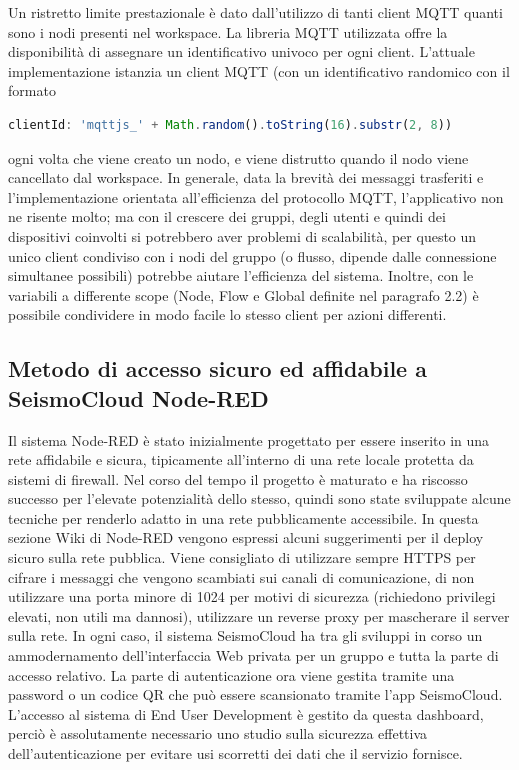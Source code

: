 \documentclass[a4paper,10pt]{memoir}
\begin{document}
Un ristretto limite prestazionale è dato dall'utilizzo di tanti client MQTT quanti sono i nodi presenti nel workspace. La libreria MQTT utilizzata offre la disponibilità di assegnare un identificativo univoco per ogni client.
L'attuale implementazione istanzia un client MQTT (con un identificativo randomico con il formato 
\begin{lstlisting}[language=Javascript]
clientId: 'mqttjs_' + Math.random().toString(16).substr(2, 8))
\end{lstlisting}
ogni volta che viene creato un nodo, e viene distrutto quando il nodo viene cancellato dal workspace.
In generale, data la brevità dei messaggi trasferiti e l'implementazione orientata all'efficienza del protocollo MQTT, l'applicativo non ne risente molto; ma con il crescere dei gruppi, degli utenti e quindi dei dispositivi coinvolti si potrebbero aver problemi di scalabilità, per questo un unico client condiviso con i nodi del gruppo (o flusso, dipende dalle connessione simultanee possibili) potrebbe aiutare l'efficienza del sistema.
Inoltre, con le variabili a differente scope (Node, Flow e Global definite nel paragrafo 2.2) è possibile condividere in modo facile lo stesso client per azioni differenti.

\subsection{Metodo di accesso sicuro ed affidabile a SeismoCloud Node-RED}

Il sistema Node-RED è stato inizialmente progettato per essere inserito in una rete affidabile e sicura, tipicamente all'interno di una rete locale protetta da sistemi di firewall. Nel corso del tempo il progetto è maturato e ha riscosso  successo per l'elevate potenzialità dello stesso, quindi sono state sviluppate alcune tecniche per renderlo adatto in una rete pubblicamente accessibile.
In questa sezione Wiki di Node-RED \cite{node-red-internet} vengono espressi alcuni suggerimenti per il deploy sicuro sulla rete pubblica.
Viene consigliato di utilizzare sempre HTTPS per cifrare i messaggi che vengono scambiati sui canali di comunicazione, di non utilizzare una porta minore di 1024 per motivi di sicurezza (richiedono privilegi elevati, non utili ma dannosi), utilizzare un reverse proxy per mascherare il server sulla rete. In ogni caso, il sistema SeismoCloud ha tra gli sviluppi in corso un ammodernamento dell'interfaccia Web privata per un gruppo e tutta la parte di accesso relativo. La parte di autenticazione ora viene gestita tramite una password o un codice QR che può essere scansionato tramite l'app SeismoCloud. L'accesso al sistema di End User Development è gestito da questa dashboard, perciò è assolutamente necessario uno studio sulla sicurezza effettiva dell'autenticazione per evitare usi scorretti dei dati che il servizio fornisce.
\end{document}
